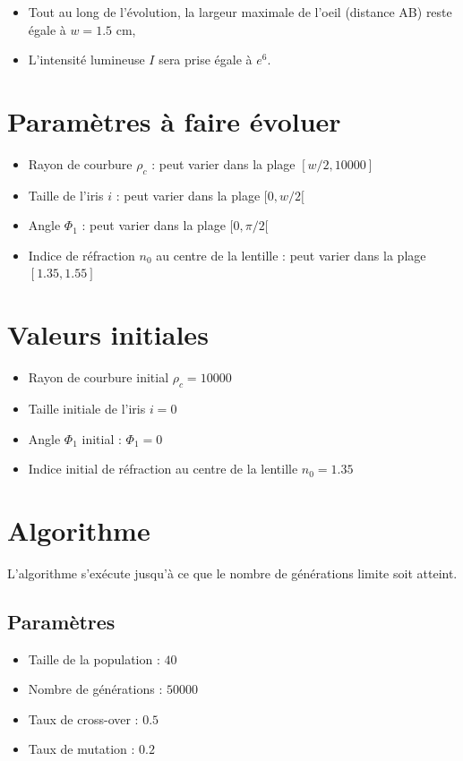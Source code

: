 \documentclass[a4paper,11pt]{article}
\begin{document}
\begin{itemize}
\item Tout au long de l'évolution, la largeur maximale de l'oeil (distance AB) reste égale à $w = 1.5$ cm,
\item L'intensité lumineuse $I$ sera prise égale à $e^{6}$.
\end{itemize}

\section{Paramètres à faire évoluer}

\begin{itemize}
\item Rayon de courbure $\rho_{c}$ : peut varier dans la plage $[w/2, 10000]$
\item Taille de l'iris $i$ : peut varier dans la plage $[0, w/2[$
\item Angle $\Phi_{1}$ : peut varier dans la plage $[0, \pi/2[$
\item Indice de réfraction $n_{0}$ au centre de la lentille : peut varier dans la plage $[1.35, 1.55]$
\end{itemize}

\section{Valeurs initiales}

\begin{itemize}
\item Rayon de courbure initial $\rho_{c} = 10000$
\item Taille initiale de l'iris $i = 0$
\item Angle $\Phi_{1}$ initial : $\Phi_{1} = 0$
\item Indice initial de réfraction au centre de la lentille $n_{0} = 1.35$
\end{itemize}

\section{Algorithme}

L'algorithme s'exécute jusqu'à ce que le nombre de générations limite soit atteint.

\subsection{Paramètres}

\begin{itemize}
\item Taille de la population : $40$
\item Nombre de générations : $50 000$
\item Taux de cross-over : $0.5$
\item Taux de mutation : $0.2$
\end{itemize}
\end{document}
